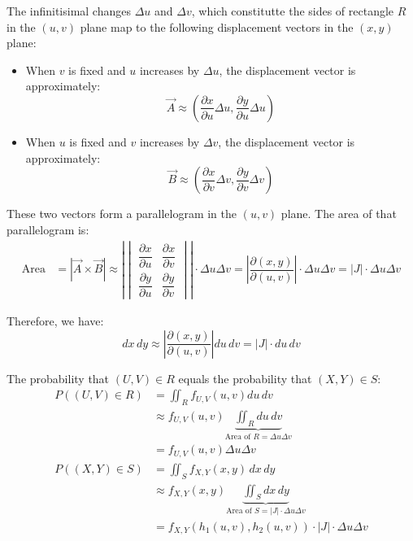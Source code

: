 \documentclass[twoside]{book}
\begin{document}
The infinitisimal changes $\Delta u$ and $\Delta v$, which constitutte the sides of rectangle $R$ in the $(u, v)$ plane map to the following displacement vectors in the $(x, y)$ plane:

\begin{itemize}
  \item When $v$ is fixed and $u$ increases by $\Delta u$, the displacement vector is approximately:
  \[
  \vec{A} \approx \left( \dfrac{\partial x}{\partial u} \Delta u, \dfrac{\partial y}{\partial u} \Delta u \right)
  \]

  \item When $u$ is fixed and $v$ increases by $\Delta v$, the displacement vector is approximately:
  \[
  \vec{B} \approx \left( \dfrac{\partial x}{\partial v} \Delta v, \dfrac{\partial y}{\partial v} \Delta v \right)
  \]
\end{itemize}

These two vectors form a parallelogram in the $(u,v)$ plane. The area of that parallelogram is:
\begin{align*}
\text{Area} &= |\vec{A} \times \vec{B}| \approx \left|\begin{vmatrix}
\dfrac{\partial x}{\partial u} & \dfrac{\partial x}{\partial v} \\[0.6em]
\dfrac{\partial y}{\partial u} & \dfrac{\partial y}{\partial v}
\end{vmatrix}\right| \cdot \Delta u \Delta v = \left| \dfrac{\partial(x, y)}{\partial(u, v)} \right| \cdot \Delta u \Delta v = \left| J \right| \cdot \Delta u \Delta v
\end{align*}


Therefore, we have:
\[
dx\,dy \approx \left| \frac{\partial(x, y)}{\partial(u, v)} \right| du\,dv = \left| J \right| \cdot du\,dv
\]


The probability that $(U,V) \in R$ equals the probability that $(X,Y) \in S$:
\begin{align*}
P((U,V) \in R) &= \iint_R f_{U,V}(u,v) du\, dv \\
&\approx f_{U,V}(u,v) \underbrace{\iint_R du\, dv}_{\text{Area of }R = \Delta u \Delta v} \\
&= f_{U,V}(u,v) \Delta u \Delta v \\
P((X,Y) \in S) &= \iint_S f_{X,Y}(x,y) \, dx \, dy \\
&\approx  f_{X,Y}(x,y) \underbrace{\iint_S dx \,dy}_{\text{Area of }S = |J|\cdot\Delta u \Delta v} \\
&= f_{X,Y}(h_1(u,v), h_2(u,v)) \cdot |J|\cdot\Delta u \Delta v
\end{align*}
\end{document}
